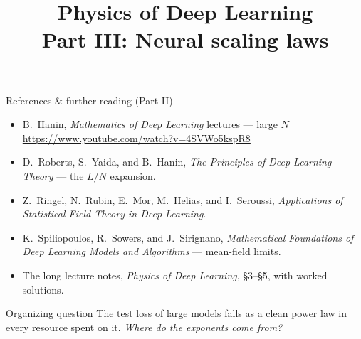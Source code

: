 \documentclass[11pt]{beamer}
\begin{document}
\begin{frame}{References \& further reading (Part II)}
  \small
  \begin{itemize}
    \item B.~Hanin, \emph{Mathematics of Deep Learning} lectures --- large $N$\\
      {\footnotesize \url{https://www.youtube.com/watch?v=4SVWo5kspR8}}
    \item D.~Roberts, S.~Yaida, and B.~Hanin, \emph{The Principles of
      Deep Learning Theory} --- the $L/N$ expansion.
    \item Z.~Ringel, N.~Rubin, E.~Mor, M.~Helias, and I.~Seroussi,
      \emph{Applications of Statistical Field Theory in Deep Learning}.
    \item K.~Spiliopoulos, R.~Sowers, and J.~Sirignano,
      \emph{Mathematical Foundations of Deep Learning Models and
      Algorithms} --- mean-field limits.
    \item The long lecture notes, \emph{Physics of Deep Learning},
      \S3--\S5, with worked solutions.
  \end{itemize}
\end{frame}

\title{Physics of Deep Learning\\[2pt]
\large Part III: Neural scaling laws}
\begin{frame}
  \titlepage
  \vspace{-2mm}
  \begin{block}{Organizing question}
    The test loss of large models falls as a clean power law in every
    resource spent on it.  \emph{Where do the exponents come
    from?}
  \end{block}
\end{frame}
\end{document}
